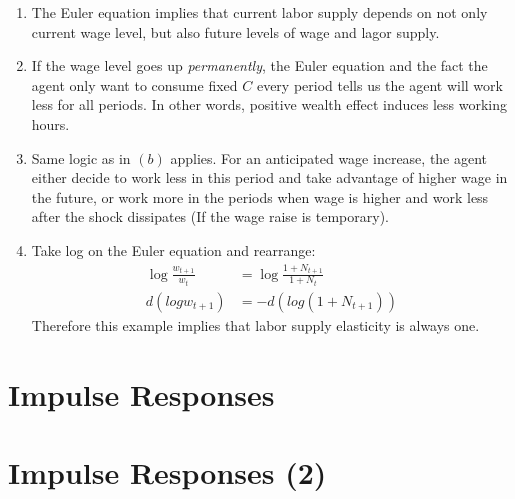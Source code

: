 \documentclass[11pt]{amsart}
\begin{document}
\begin{enumerate}[label=(\alph*)]
    \item The Euler equation implies that current labor supply depends on not only current wage level, but also future levels of wage and lagor supply. 
    \item If the wage level goes up \textit{permanently}, the Euler equation and the fact the agent only want to consume fixed $C$ every period tells us the agent will work less for all periods. In other words, positive wealth effect induces less working hours. 
    \item Same logic as in $(b)$ applies. For an anticipated wage increase, the agent either decide to work less in this period and take advantage of higher wage in the future, or work more in the periods when wage is higher and work less after the shock dissipates (If the wage raise is temporary).
    \item Take log on the Euler equation and rearrange:
    \begin{align*}
    \log \frac{w_{t+1}}{w_t} &= \log \frac{1+N_{t+1}}{1+ N_t} \\
    d (log w_{t+1}) &= -d (log (1+N_{t+1}))
    \end{align*}
    Therefore this example implies that labor supply elasticity is always one. 
\end{enumerate}
\section{Impulse Responses}
\section{Impulse Responses (2)}
\end{document}
